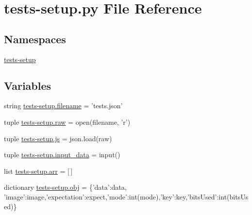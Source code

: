 \hypertarget{tests-setup_8py}{\section{tests-\/setup.py File Reference}
\label{tests-setup_8py}
}
\subsection*{Namespaces}
\begin{DoxyCompactItemize}
\item 
\hyperlink{namespacetests-setup}{tests-\/setup}
\end{DoxyCompactItemize}
\subsection*{Variables}
\begin{DoxyCompactItemize}
\item 
string \hyperlink{namespacetests-setup_a1c1b6d4c14026d664106586c65e10a94}{tests-\/setup.\-filename} = 'tests.\-json'
\item 
tuple \hyperlink{namespacetests-setup_a1788203b7bbd6108e09617328eaeceb9}{tests-\/setup.\-raw} = open(filename, 'r')
\item 
tuple \hyperlink{namespacetests-setup_a08da0efe29fc9ddaa5f121eda9688b6d}{tests-\/setup.\-js} = json.\-load(raw)
\item 
tuple \hyperlink{namespacetests-setup_afd542601d7bb174d46d247a6b8f52580}{tests-\/setup.\-input\-\_\-data} = input()
\item 
list \hyperlink{namespacetests-setup_a274aaa7c0d5733ef5f48372d9481f34a}{tests-\/setup.\-arr} = \mbox{[}$\,$\mbox{]}
\item 
dictionary \hyperlink{namespacetests-setup_afb80c1236926b5468a6d3e942a527a96}{tests-\/setup.\-obj} = \{'data'\-:data, 'image'\-:image,'expectation'\-:expect,'mode'\-:int(mode),'key'\-:key,'bits\-Used'\-:int(bits\-Used)\}
\end{DoxyCompactItemize}
